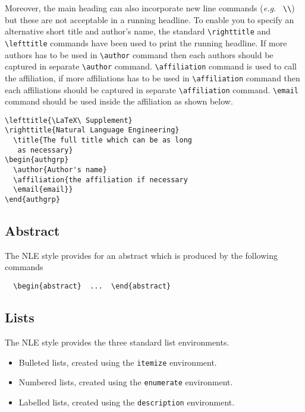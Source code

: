 \documentclass{nle}
\begin{document}
Moreover, the main heading can also incorporate new line commands
({\it e.g.\ } \verb"\\") but these are not acceptable in a running headline.
To enable you to specify an alternative short title and author's name, the
standard \verb"\righttitle" and \verb"\lefttitle" commands have been used to print the running headline. If more authors has to be used in \verb"\author" command then each authors should be captured in separate \verb"\author" command.
\verb"\affiliation" command is used to call the affiliation, if more affiliations has to be used in \verb"\affiliation" command then each affiliations should be captured in separate \verb"\affiliation" command.
\verb"\email" command should be used inside the affiliation as shown below.
%
\begin{verbatim}
\lefttitle{\LaTeX\ Supplement}
\righttitle{Natural Language Engineering}
  \title{The full title which can be as long
   as necessary}
\begin{authgrp}
  \author{Author's name}
  \affiliation{the affiliation if necessary
  \email{email}}
\end{authgrp}
\end{verbatim}
%

\subsection{Abstract}

The NLE style provides for an abstract which is produced by the following
commands
%
\begin{verbatim}
  \begin{abstract}  ...  \end{abstract}
\end{verbatim}

\subsection{Lists}

The NLE style provides the three standard list environments.
\begin{itemize}
  \item Bulleted lists, created using the \verb"itemize" environment.
  \item Numbered lists, created using the \verb"enumerate" environment.
  \item Labelled lists, created using the \verb"description" environment.
\end{itemize}
\end{document}
